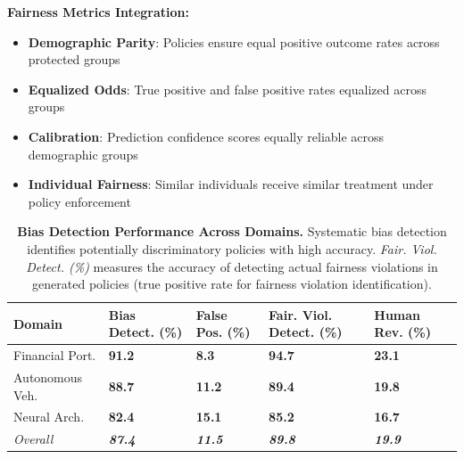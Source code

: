 \documentclass[sigconf,natbib]{acmart}
\renewcommand{\arraystretch}{1.1} %
\renewcommand{\arraystretch}{1.1} %
\newcommand{\tablesize}{\footnotesize} %
\newcommand{\tablenumfmt}[1]{\textbf{#1}} %
\newcommand{\tableheader}[1]{\textbf{#1}} %
\newcommand{\compacttable}{\setlength{\arraystretch}{1.0}\setlength{\tabcolsep}{4pt}} %
\newcommand{\resettable}{\setlength{\arraystretch}{1.1}\setlength{\tabcolsep}{5pt}} %
\begin{document}
\textbf{Fairness Metrics Integration:}
\begin{itemize}
    \item \textbf{Demographic Parity}: Policies ensure equal positive outcome rates across protected groups
    \item \textbf{Equalized Odds}: True positive and false positive rates equalized across groups
    \item \textbf{Calibration}: Prediction confidence scores equally reliable across demographic groups
    \item \textbf{Individual Fairness}: Similar individuals receive similar treatment under policy enforcement
\end{itemize}

\begin{table}[htbp]
  \centering
  \caption{\textbf{Bias Detection Performance Across Domains.} Systematic bias detection identifies potentially discriminatory policies with high accuracy. \textit{Fair. Viol. Detect. (\%)} measures the accuracy of detecting actual fairness violations in generated policies (true positive rate for fairness violation identification).}
  \label{tab:bias_detection_performance}
  \compacttable\tablesize
  \begin{tabular}{@{}l>{\centering\arraybackslash}p{1.1cm}>{\centering\arraybackslash}p{1.1cm}>{\centering\arraybackslash}p{1.2cm}>{\centering\arraybackslash}p{1.1cm}@{}}
    \toprule
    \tableheader{Domain} & \tableheader{Bias Detect. (\%)} & \tableheader{False Pos. (\%)} & \tableheader{Fair. Viol. Detect. (\%)} & \tableheader{Human Rev. (\%)} \\
    \midrule
    Financial Port.    & \tablenumfmt{91.2} & \tablenumfmt{8.3}  & \tablenumfmt{94.7} & \tablenumfmt{23.1} \\
    Autonomous Veh.     & \tablenumfmt{88.7} & \tablenumfmt{11.2} & \tablenumfmt{89.4} & \tablenumfmt{19.8} \\
    Neural Arch.    & \tablenumfmt{82.4} & \tablenumfmt{15.1} & \tablenumfmt{85.2} & \tablenumfmt{16.7} \\
    \midrule
    \textit{Overall} & \textit{\tablenumfmt{87.4}} & \textit{\tablenumfmt{11.5}} & \textit{\tablenumfmt{89.8}} & \textit{\tablenumfmt{19.9}} \\
    \bottomrule
  \end{tabular}
  \resettable
\end{table}
\end{document}
